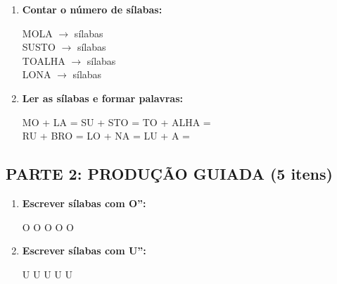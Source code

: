 \begin{exercicio}
\begin{enumerate}
  \item \textbf{Contar o número de sílabas:}
  \begin{center}
  MOLA $\rightarrow$ \underline{\hspace{1cm}} sílabas \\
  SUSTO $\rightarrow$ \underline{\hspace{1cm}} sílabas \\
  TOALHA $\rightarrow$ \underline{\hspace{1cm}} sílabas \\
  LONA $\rightarrow$ \underline{\hspace{1cm}} sílabas
  \end{center}

  \item \textbf{Ler as sílabas e formar palavras:}
  \begin{center}
  MO + LA = \underline{\hspace{2cm}} \quad SU + STO = \underline{\hspace{2cm}} \quad TO + ALHA = \underline{\hspace{2cm}} \\
  RU + BRO = \underline{\hspace{2cm}} \quad LO + NA = \underline{\hspace{2cm}} \quad LU + A = \underline{\hspace{2cm}}
  \end{center}
\end{enumerate}

\subsection*{PARTE 2: PRODUÇÃO GUIADA (5 itens)}

\begin{enumerate}[resume]
  \item \textbf{Escrever sílabas com O'':}
  \begin{center}
  \underline{\hspace{1.5cm}}O \quad \underline{\hspace{1.5cm}}O \quad \underline{\hspace{1.5cm}}O \quad \underline{\hspace{1.5cm}}O \quad \underline{\hspace{1.5cm}}O
  \end{center}

  \item \textbf{Escrever sílabas com U'':}
  \begin{center}
  \underline{\hspace{1.5cm}}U \quad \underline{\hspace{1.5cm}}U \quad \underline{\hspace{1.5cm}}U \quad \underline{\hspace{1.5cm}}U \quad \underline{\hspace{1.5cm}}U
  \end{center}


\end{enumerate}
\end{exercicio}
